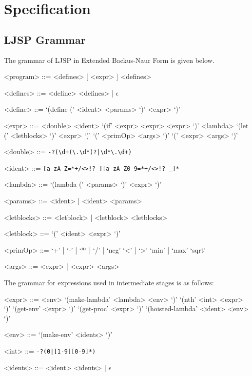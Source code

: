 \documentclass[11pt]{report}
\begin{document}
\chapter{Specification}
\section{LJSP Grammar}
The grammar of LJSP in Extended Backus-Naur Form is given below.
\begin{grammar}
<program> ::= <defines> [ <expr> ] <defines>

<defines> ::= <define> <defines> | $\epsilon$

<define> ::= `(define (' <ident> <params> `)' <expr> `)'

<expr> ::= <double>
\alt <ident>
\alt `(if' <expr> <expr> <expr> `)'
\alt <lambda>
\alt `(let (' <letblocks> `)' <expr> `)'
\alt `(' <primOp> <args> `)'
\alt `(' <expr> <args> `)'

<double> ::= \texttt{-?(\textbackslash d+(\textbackslash.\textbackslash d*)?|\textbackslash d*\textbackslash.\textbackslash d+)}

<ident> ::= \texttt{[a-zA-Z=*+/\textless\textgreater!?-][a-zA-Z0-9=*+/\textless\textgreater!?-_]*}

<lambda> ::= `(lambda (' <params> `)' <expr> `)'

<params> ::= <ident> | <ident> <params>

<letblocks> ::= <letblock> | <letblock> <letblocks>

<letblock> ::= `(' <ident> <expr> `)'

<primOp> ::= `+' | `-' | `*' | `/' | `neg'
\alt `<' | `>'
\alt `min' | `max'
\alt `sqrt'

<args> ::= <expr> | <expr> <args>
\end{grammar}

The grammar for expressions used in intermediate stages is as follows:
\begin{grammar}
<expr> ::= <env>
\alt `(make-lambda' <lambda> <env> `)'
\alt `(nth' <int> <expr> `)'
\alt `(get-env' <expr> `)'
\alt `(get-proc' <expr> `)'
\alt `(hoisted-lambda' <ident> <env> `)'

<env> ::= `(make-env' <idents> `)'

<int> ::= \texttt{-?(0|[1-9][0-9]*)}

<idents> ::= <ident> <idents> | $\epsilon$
\end{grammar}
\end{document}

